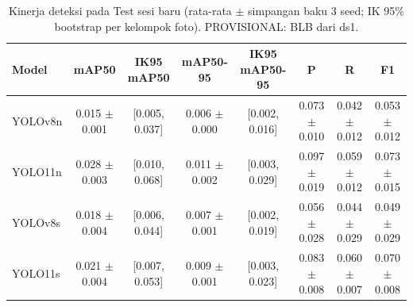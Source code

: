 \begin{table}[!t]
\centering
\caption{Kinerja deteksi pada Test sesi baru (rata-rata $\pm$ simpangan baku 3 seed; IK 95\% bootstrap per kelompok foto). PROVISIONAL: BLB dari ds1.}
\label{tab:utama_test_new_session_dengan_background}
\footnotesize
\begin{tabular}{lccccccc}
\hline
\textbf{Model} & \textbf{mAP50} & \textbf{IK95 mAP50} & \textbf{mAP50-95} & \textbf{IK95 mAP50-95} & \textbf{P} & \textbf{R} & \textbf{F1} \\
\hline
YOLOv8n & 0.015 $\pm$ 0.001 & [0.005, 0.037] & 0.006 $\pm$ 0.000 & [0.002, 0.016] & 0.073 $\pm$ 0.010 & 0.042 $\pm$ 0.012 & 0.053 $\pm$ 0.012 \\
YOLO11n & 0.028 $\pm$ 0.003 & [0.010, 0.068] & 0.011 $\pm$ 0.002 & [0.003, 0.029] & 0.097 $\pm$ 0.019 & 0.059 $\pm$ 0.012 & 0.073 $\pm$ 0.015 \\
YOLOv8s & 0.018 $\pm$ 0.004 & [0.006, 0.044] & 0.007 $\pm$ 0.001 & [0.002, 0.019] & 0.056 $\pm$ 0.028 & 0.044 $\pm$ 0.029 & 0.049 $\pm$ 0.029 \\
YOLO11s & 0.021 $\pm$ 0.004 & [0.007, 0.053] & 0.009 $\pm$ 0.001 & [0.003, 0.023] & 0.083 $\pm$ 0.008 & 0.060 $\pm$ 0.007 & 0.070 $\pm$ 0.008 \\
\hline
\end{tabular}
\end{table}
